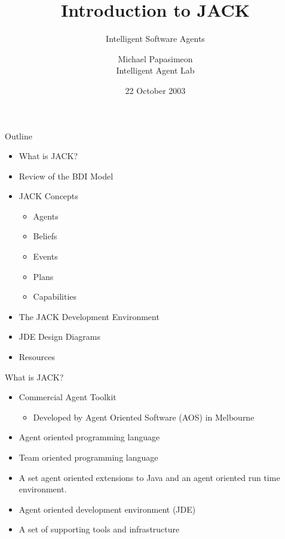 \documentclass[aspectratio=1610,xcolor=dvipsnames,t]{beamer}
\title[JACK Programming]{Introduction to JACK}
\subtitle{Intelligent Software Agents}
\author[Michael Papasimeon]{Michael Papasimeon \\[0.2cm] \tiny{Intelligent Agent Lab} }
\date{22 October 2003}
\begin{document}
\begin{frame}
    \maketitle
\end{frame} 

\begin{frame}{Outline} 
    \begin{itemize}
        \item What is JACK?
        \item Review of the BDI Model
        \item JACK Concepts
        \begin{itemize}
            \item Agents
            \item Beliefs
            \item Events
            \item Plans
            \item Capabilities
        \end{itemize}
    \item The JACK Development Environment
    \item JDE Design Diagrams
    \item Resources
    \end{itemize} 
\end{frame} 

\begin{frame}{What is JACK?}
    \begin{itemize} 
        \item Commercial Agent Toolkit
        \begin{itemize}
            \item Developed by Agent Oriented Software (AOS) in Melbourne
        \end{itemize}
        \item Agent oriented programming language
        \item Team oriented programming language
        \item A set agent oriented extensions to Java and an 
              agent oriented run time environment.
        \item Agent oriented development environment (JDE)
        \item A set of supporting tools and infrastructure
    \end{itemize} 
\end{frame} 
\end{document}
